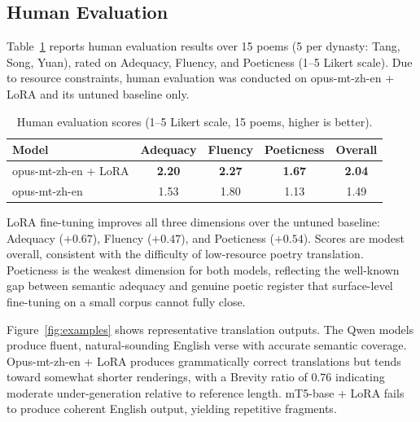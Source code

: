 \subsection{Human Evaluation}

Table~\ref{tab:human_eval} reports human evaluation results over 15 poems (5 per dynasty: Tang, Song, Yuan), rated on Adequacy, Fluency, and Poeticness (1--5 Likert scale). Due to resource constraints, human evaluation was conducted on opus-mt-zh-en + LoRA and its untuned baseline only.

\begin{table}[htbp]
\centering
\caption{Human evaluation scores (1--5 Likert scale, 15 poems, higher is better).}
\label{tab:human_eval}
\renewcommand{\arraystretch}{1.2}
\begin{tabular}{@{}lcccc@{}}
\toprule
\textbf{Model} & \textbf{Adequacy} & \textbf{Fluency} & \textbf{Poeticness} & \textbf{Overall} \\
\midrule
opus-mt-zh-en + LoRA & \textbf{2.20} & \textbf{2.27} & \textbf{1.67} & \textbf{2.04} \\
opus-mt-zh-en        & 1.53          & 1.80          & 1.13          & 1.49          \\
\bottomrule
\end{tabular}
\end{table}

LoRA fine-tuning improves all three dimensions over the untuned baseline: Adequacy ($+0.67$), Fluency ($+0.47$), and Poeticness ($+0.54$). Scores are modest overall, consistent with the difficulty of low-resource poetry translation. Poeticness is the weakest dimension for both models, reflecting the well-known gap between semantic adequacy and genuine poetic register that surface-level fine-tuning on a small corpus cannot fully close.

Figure~\ref{fig:examples} shows representative translation outputs. The Qwen models produce fluent, natural-sounding English verse with accurate semantic coverage. Opus-mt-zh-en + LoRA produces grammatically correct translations but tends toward somewhat shorter renderings, with a Brevity ratio of $0.76$ indicating moderate under-generation relative to reference length. mT5-base + LoRA fails to produce coherent English output, yielding repetitive fragments.


